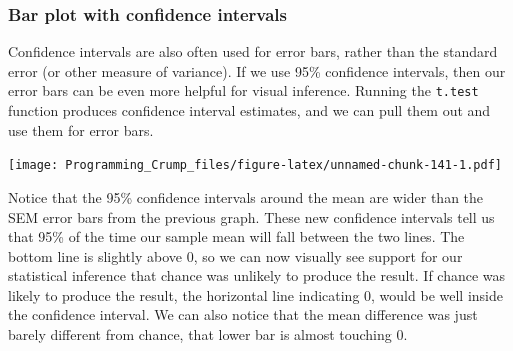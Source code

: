 \documentclass[]{book}
\newenvironment{Shaded}{\begin{snugshade}}{\end{snugshade}}
\newcommand{\KeywordTok}[1]{\textcolor[rgb]{0.13,0.29,0.53}{\textbf{{#1}}}}
\newcommand{\DataTypeTok}[1]{\textcolor[rgb]{0.13,0.29,0.53}{{#1}}}
\newcommand{\DecValTok}[1]{\textcolor[rgb]{0.00,0.00,0.81}{{#1}}}
\newcommand{\StringTok}[1]{\textcolor[rgb]{0.31,0.60,0.02}{{#1}}}
\newcommand{\NormalTok}[1]{{#1}}
\theoremstyle{definition}
\theoremstyle{definition}
\theoremstyle{definition}
\theoremstyle{remark}
\begin{document}
\subsubsection{Bar plot with confidence
intervals}\label{bar-plot-with-confidence-intervals}

Confidence intervals are also often used for error bars, rather than the
standard error (or other measure of variance). If we use 95\% confidence
intervals, then our error bars can be even more helpful for visual
inference. Running the \texttt{t.test} function produces confidence
interval estimates, and we can pull them out and use them for error
bars.

\begin{Shaded}
\end{Shaded}

\texttt{[image: Programming\_Crump\_files/figure-latex/unnamed-chunk-141-1.pdf]}

Notice that the 95\% confidence intervals around the mean are wider than
the SEM error bars from the previous graph. These new confidence
intervals tell us that 95\% of the time our sample mean will fall
between the two lines. The bottom line is slightly above 0, so we can
now visually see support for our statistical inference that chance was
unlikely to produce the result. If chance was likely to produce the
result, the horizontal line indicating 0, would be well inside the
confidence interval. We can also notice that the mean difference was
just barely different from chance, that lower bar is almost touching 0.
\end{document}
